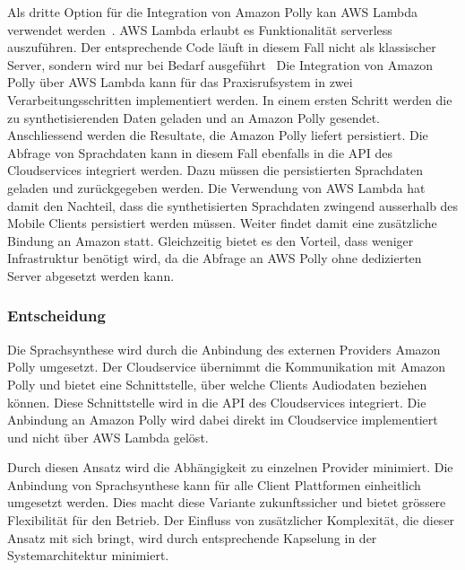 Als dritte Option für die Integration von Amazon Polly kan AWS Lambda verwendet werden~\cite{aws_polly}.
AWS Lambda erlaubt es Funktionalität serverless auszuführen.
Der entsprechende Code läuft in diesem Fall nicht als klassischer Server, sondern wird nur bei Bedarf ausgeführt~\cite{aws_lambda}
Die Integration von Amazon Polly über AWS Lambda kann für das Praxisrufsystem in zwei Verarbeitungsschritten implementiert werden.
In einem ersten Schritt werden die zu synthetisierenden Daten geladen und an Amazon Polly gesendet.
Anschliessend werden die Resultate, die Amazon Polly liefert persistiert.
Die Abfrage von Sprachdaten kann in diesem Fall ebenfalls in die API des Cloudservices integriert werden.
Dazu müssen die persistierten Sprachdaten geladen und zurückgegeben werden.
Die Verwendung von AWS Lambda hat damit den Nachteil, dass die synthetisierten Sprachdaten zwingend ausserhalb des Mobile Clients persistiert werden müssen.
Weiter findet damit eine zusätzliche Bindung an Amazon statt.
Gleichzeitig bietet es den Vorteil, dass weniger Infrastruktur benötigt wird, da die Abfrage an AWS Polly ohne dedizierten Server abgesetzt werden kann.

\subsubsection{Entscheidung}

Die Sprachsynthese wird durch die Anbindung des externen Providers Amazon Polly umgesetzt.
Der Cloudservice übernimmt die Kommunikation mit Amazon Polly und bietet eine Schnittstelle, über welche Clients Audiodaten beziehen können.
Diese Schnittstelle wird in die API des Cloudservices integriert.
Die Anbindung an Amazon Polly wird dabei direkt im Cloudservice implementiert und nicht über AWS Lambda gelöst.

Durch diesen Ansatz wird die Abhängigkeit zu einzelnen Provider minimiert.
Die Anbindung von Sprachsynthese kann für alle Client Plattformen einheitlich umgesetzt werden.
Dies macht diese Variante zukunftssicher und bietet grössere Flexibilität für den Betrieb.
Der Einfluss von zusätzlicher Komplexität, die dieser Ansatz mit sich bringt, wird durch entsprechende Kapselung in der Systemarchitektur minimiert.

\clearpage
